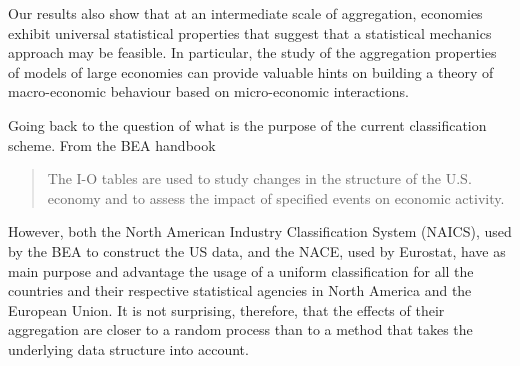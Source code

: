 Our results also show that at an intermediate scale of aggregation,
economies exhibit universal statistical properties that suggest that a
statistical mechanics approach may be feasible. In particular, the
study of the aggregation properties of models of large economies can
provide valuable hints on building a theory of macro-economic
behaviour based on micro-economic interactions.

Going back to the question of what is the purpose of the current
classification scheme. From the BEA handbook

\begin{quote}
  The I-O tables are used to study changes in the structure of the
  U.S. economy and to assess the impact of specified events on
  economic activity.
\end{quote}

However, both the North American Industry Classification System
(NAICS), used by the BEA to construct the US data, and the NACE, used
by Eurostat, have as main purpose and advantage the usage of a uniform
classification for all the countries and their respective statistical
agencies in North America and the European Union. It is not surprising,
therefore, that the effects of their aggregation are closer to a
random process than to a method that takes the underlying data structure into
account.
